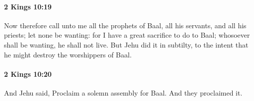 		\paragraph{2 Kings 10:19} %
			\label{2KINGS-10-19}

			Now therefore call unto me all the prophets of Baal, all his servants, and all his priests; let none be wanting: for I have a great sacrifice to do to Baal; whosoever shall be wanting, he shall not live. But Jehu did it in subtilty, to the intent that he might destroy the worshippers of Baal.


		\paragraph{2 Kings 10:20} %
			\label{2KINGS-10-20}

			And Jehu said, Proclaim a solemn assembly for Baal. And they proclaimed it.


